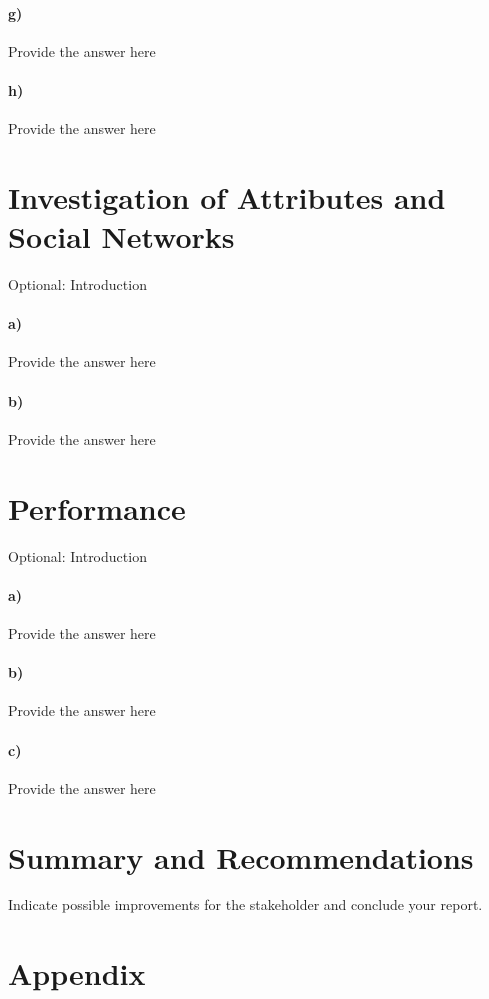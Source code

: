 \documentclass[12pt]{report}
\renewcommand*{\thesection}{Q\arabic{section}}
\begin{document}
\paragraph{g)} \textlangle Provide the answer here\textrangle
\paragraph{h)} \textlangle Provide the answer here\textrangle


\section{Investigation of Attributes and Social Networks}
\textlangle Optional: Introduction \textrangle
\paragraph{a)} \textlangle Provide the answer here\textrangle
\paragraph{b)} \textlangle Provide the answer here\textrangle

\section{Performance}
\textlangle Optional: Introduction \textrangle
\paragraph{a)} \textlangle Provide the answer here\textrangle
\paragraph{b)} \textlangle Provide the answer here\textrangle
\paragraph{c)} \textlangle Provide the answer here\textrangle

\section{Summary and Recommendations}
\textlangle Indicate possible improvements for the stakeholder and conclude your report. \textrangle

\newpage
\renewcommand*{\thesection}{}
\section{Appendix}
\end{document}
